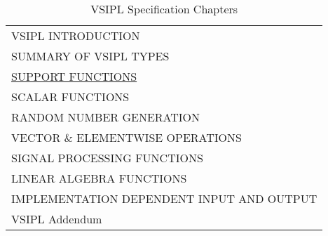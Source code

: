\begin{table}[H]
\caption{VSIPL Specification Chapters}
\label{tab:vsiplAPI}
\begin{center}
\begin{tabular}{l}
VSIPL INTRODUCTION\\
SUMMARY OF VSIPL TYPES\\
\hyperlink{vsiplAPISupport}{SUPPORT FUNCTIONS}\\
SCALAR FUNCTIONS\\
RANDOM NUMBER GENERATION\\
VECTOR \& ELEMENTWISE OPERATIONS\\
SIGNAL PROCESSING FUNCTIONS\\
LINEAR ALGEBRA FUNCTIONS\\
IMPLEMENTATION DEPENDENT INPUT AND OUTPUT\\
VSIPL Addendum\\
\end{tabular}
\end{center}
\label{default}
\end{table}%